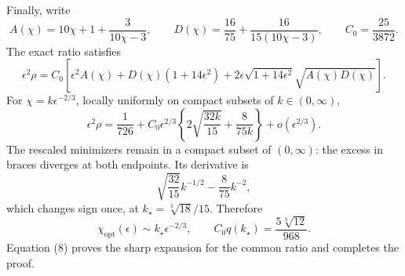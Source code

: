 Finally, write
\[
 A(\chi)=10\chi+1+\frac3{10\chi-3},
 \qquad
 D(\chi)=\frac{16}{75}+\frac{16}{15(10\chi-3)},
 \qquad C_0=\frac{25}{3872}.
\]
The exact ratio satisfies
\[
 \epsilon^2\rho
 =C_0\left[\epsilon^2A(\chi)+D(\chi)(1+14\epsilon^2)
 +2\epsilon\sqrt{1+14\epsilon^2}\sqrt{A(\chi)D(\chi)}\right]. \tag{7}
\]
For \(\chi=k\epsilon^{-2/3}\), locally uniformly on compact subsets of \(k\in(0,\infty)\),
\[
 \epsilon^2\rho
 =\frac1{726}+C_0\epsilon^{2/3}
 \left\{2\sqrt{\frac{32k}{15}}+\frac8{75k}\right\}
 +o(\epsilon^{2/3}).                                      \tag{8}
\]
The rescaled minimizers remain in a compact subset of \((0,\infty)\): the excess in braces diverges at both endpoints. Its derivative is
\[
 \sqrt{\frac{32}{15}}k^{-1/2}-\frac8{75}k^{-2},
\]
which changes sign once, at \(k_\star=\sqrt[3]{18}/15\). Therefore
\[
 \chi_{\mathrm{opt}}(\epsilon)\sim k_\star\epsilon^{-2/3},
 \qquad
 C_0q(k_\star)=\frac{5\sqrt[3]{12}}{968}.
\]
Equation (8) proves the sharp expansion for the common ratio and completes the proof.